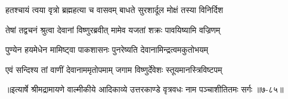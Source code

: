 \twolineshloka
{हतश्चायं त्वया वृत्रो ब्रह्महत्या च वासवम्}
{बाधते सुरशार्दूल मोक्षं तस्या विनिर्दिश} %

\twolineshloka
{तेषां तद्वचनं श्रुत्वा देवानां विष्णुरब्रवीत्}
{मामेव यजतां शक्रः पावयिष्यामि वज्रिणम्} %

\twolineshloka
{पुण्येन हयमेधेन मामिष्ट्वा पाकशासनः}
{पुनरेष्यति देवानामिन्द्रत्वमकुतोभयम्} %

\twolineshloka
{एवं सन्दिश्य तां वाणीं देवानाममृतोपमाम्}
{जगाम विष्णुर्देवेशः स्तूयमानस्त्रिविष्टपम्} %


॥इत्यार्षे श्रीमद्रामायणे वाल्मीकीये आदिकाव्ये उत्तरकाण्डे वृत्रवधः नाम पञ्चाशीतितमः सर्गः ॥७-८५॥
